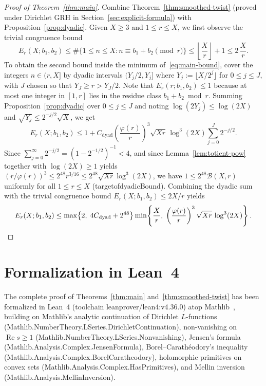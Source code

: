 \documentclass[11pt,reqno]{amsart}
\numberwithin{equation}{section}
\theoremstyle{definition}
\newcommand{\1}{\mathbf{1}}
\renewcommand{\Re}{\operatorname{Re}}
\newcommand{\lean}[1]{{\footnotesize\ttfamily\renewcommand{\_}{\textunderscore\allowbreak}#1}}
\newcommand{\GRH}{\textup{GRH}}
\begin{document}
\begin{proof}[Proof of Theorem~\ref{thm:main}]
Combine Theorem~\ref{thm:smoothed-twist} (proved under Dirichlet \GRH{} in Section~\ref{sec:explicit-formula}) with Proposition~\ref{prop:dyadic}. Given $X \ge 3$ and $1 \le r \le X$, we first observe the trivial congruence bound
\[
  E_r(X; b_1, b_2) \le \#\{1 \le n \le X : n \equiv b_1 + b_2 \pmod r\} \le \left\lfloor\frac{X}{r}\right\rfloor + 1 \le 2\,\frac{X}{r}.
\]
To obtain the second bound inside the minimum of~\eqref{eq:main-bound}, cover the integers $n \in (r, X]$ by dyadic intervals $(Y_j/2, Y_j]$ where $Y_j := \lfloor X / 2^j \rfloor$ for $0 \le j \le J$, with $J$ chosen so that $Y_J \ge r > Y_J / 2$. Note that $E_r(r; b_1, b_2) \le 1$ because at most one integer in $[1, r]$ lies in the residue class $b_1 + b_2 \bmod r$. Summing Proposition~\ref{prop:dyadic} over $0 \le j \le J$ and noting $\log(2 Y_j) \le \log(2X)$ and $\sqrt{Y_j} \le 2^{-j/2}\sqrt{X}$, we get
\[
  E_r(X; b_1, b_2)
  \le 1 + C_{\mathrm{dyad}} \left(\frac{\varphi(r)}{r}\right)^3 \sqrt{X r}\,\log^3(2X) \sum_{j=0}^J 2^{-j/2}.
\]
Since $\sum_{j=0}^\infty 2^{-j/2} = (1 - 2^{-1/2})^{-1} < 4$, and since Lemma~\ref{lem:totient-pow} together with $\log(2X) \ge 1$ yields $(r/\varphi(r))^3 \le 2^{48} r^{3/16} \le 2^{48}\sqrt{Xr}\log^3(2X)$, we have $1 \le 2^{48}\mathcal{B}(X, r)$ uniformly for all $1 \le r \le X$ (\lean{target\_of\_dyadicBound}). Combining the dyadic sum with the trivial congruence bound $E_r(X; b_1, b_2) \le 2X/r$ yields
\[
  E_r(X; b_1, b_2) \le \max\bigl\{2,\; 4 C_{\mathrm{dyad}} + 2^{48}\bigr\} \min\!\left\{\frac{X}{r},\; \left(\frac{\varphi(r)}{r}\right)^3 \sqrt{X r}\,\log^3(2X)\right\}. \qedhere
\]
\end{proof}

\section{Formalization in Lean~4}
\label{sec:formalization}

The complete proof of Theorems~\ref{thm:main} and~\ref{thm:smoothed-twist} has been formalized in Lean~4 (toolchain \lean{leanprover/lean4:v4.36.0}) atop Mathlib~\cite{deMouraUllrich2021,Mathlib2020}, building on Mathlib's analytic continuation of Dirichlet $L$-functions (\lean{Mathlib.\allowbreak NumberTheory.\allowbreak LSeries.\allowbreak DirichletContinuation}), non-vanishing on $\Re s \ge 1$ (\lean{Mathlib.\allowbreak NumberTheory.\allowbreak LSeries.\allowbreak Nonvanishing}), Jensen's formula (\lean{Mathlib.\allowbreak Analysis.\allowbreak Complex.\allowbreak JensenFormula}), Borel--Carath\'eodory's inequality (\lean{Mathlib.\allowbreak Analysis.\allowbreak Complex.\allowbreak BorelCaratheodory}), holomorphic primitives on convex sets (\lean{Mathlib.\allowbreak Analysis.\allowbreak Complex.\allowbreak HasPrimitives}), and Mellin inversion (\lean{Mathlib.\allowbreak Analysis.\allowbreak MellinInversion}).
\end{document}
